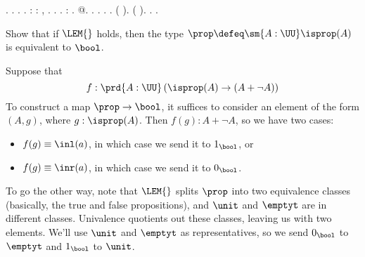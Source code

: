 \begin{coqdoccode}
\coqdocindent{1.00em}
 .  .  .\coqdoceol
\coqdocnoindent
{}.\coqdoceol
\coqdocemptyline
\coqdocnoindent
{}  : \coqdockw{\ensuremath{\forall}}   :  ,  \coqdocnotation{=} .\coqdoceol
\coqdocindent{1.00em}
 .\coqdoceol
\coqdocnoindent
{}.\coqdoceol
\coqdocemptyline
\coqdocnoindent
{}  : \coqdocnotation{(} \coqdocnotation{)} \coqdocnotation{\ensuremath{\eqvsym}} .\coqdoceol
\coqdocindent{1.00em}
 @.\coqdoceol
\coqdocindent{1.00em}
 .  .\coqdoceol
\coqdocindent{1.00em}
 .  .\coqdoceol
\coqdocindent{1.00em}
 (  ).\coqdoceol
\coqdocindent{1.00em}
 (  ).\coqdoceol
\coqdocnoindent
{}.\coqdoceol
\coqdocemptyline
\coqdocnoindent
{} .\coqdoceol
\coqdocemptyline
\end{coqdoccode}
Show that if $\LEM{}$ holds, then the type $\prop \defeq \sm{A:\UU}\isprop(A)$
is equivalent to $\bool$.


 \soln
Suppose that 
\[
  f : \prd{A:\UU}\left(\isprop(A) \to (A + \lnot A)\right)
\]
To construct a map $\prop \to \bool$, it suffices to consider an element of the
form $(A, g)$, where $g : \isprop(A)$.  Then $f(g) : A + \lnot A$, so we have
two cases:



\begin{itemize}
\item  $f(g) \equiv \inl(a)$, in which case we send it to $1_{\bool}$, or

\item  $f(g) \equiv \inr(a)$, in which case we send it to $0_{\bool}$.

\end{itemize}
To go the other way, note that $\LEM{}$ splits $\prop$ into two equivalence
classes (basically, the true and false propositions), and $\unit$ and $\emptyt$
are in different classes.  Univalence quotients out these classes, leaving us
with two elements.  We'll use $\unit$ and $\emptyt$ as representatives, so we
send $0_{\bool}$ to $\emptyt$ and $1_{\bool}$ to $\unit$.


